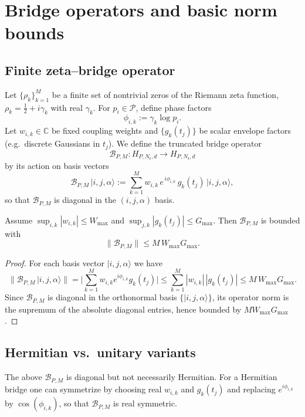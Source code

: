 \documentclass[11pt]{article}
\begin{document}
\section{Bridge operators and basic norm bounds}
\label{app:bridge}

\subsection{Finite zeta–bridge operator}

Let $\{\rho_k\}_{k=1}^M$ be a finite set of nontrivial zeros of the Riemann zeta function, $\rho_k = \tfrac12 + i\gamma_k$ with real $\gamma_k$.
For $p_i\in\mathcal{P}$, define phase factors
\[
\phi_{i,k} := \gamma_k \log p_i.
\]
Let $w_{i,k}\in\mathbb{C}$ be fixed coupling weights and $\{g_k(t_j)\}$ be scalar envelope factors (e.g.\ discrete Gaussians in $t_j$).
We define the truncated bridge operator
\[
\mathcal{B}_{P,M} : H_{P,N_t,d}\to H_{P,N_t,d}
\]
by its action on basis vectors
\[
\mathcal{B}_{P,M}\,\lvert i,j,\alpha\rangle
  := \sum_{k=1}^M w_{i,k}\, e^{\,i\phi_{i,k}}\,
     g_k(t_j) \,
     \lvert i,j,\alpha\rangle,
\]
so that $\mathcal{B}_{P,M}$ is diagonal in the $(i,j,\alpha)$ basis.

\begin{lemma}
Assume $\sup_{i,k} |w_{i,k}| \le W_{\max}$ and $\sup_{j,k} |g_k(t_j)| \le G_{\max}$.
Then $\mathcal{B}_{P,M}$ is bounded with
\[
\|\mathcal{B}_{P,M}\|
  \le M\, W_{\max} G_{\max}.
\]
\end{lemma}

\begin{proof}
For each basis vector $\lvert i,j,\alpha\rangle$ we have
\[
\bigl\|\mathcal{B}_{P,M}\,\lvert i,j,\alpha\rangle\bigr\|
  = \biggl|\sum_{k=1}^M w_{i,k} e^{i\phi_{i,k}} g_k(t_j)\biggr|
  \le \sum_{k=1}^M |w_{i,k}|\, |g_k(t_j)|
  \le M\,W_{\max} G_{\max}.
\]
Since $\mathcal{B}_{P,M}$ is diagonal in the orthonormal basis $\{\lvert i,j,\alpha\rangle\}$, its operator norm is the supremum of the absolute diagonal entries, hence bounded by $M W_{\max} G_{\max}$.
\end{proof}

\subsection{Hermitian vs.\ unitary variants}

The above $\mathcal{B}_{P,M}$ is diagonal but not necessarily Hermitian.
For a Hermitian bridge one can symmetrize by choosing real $w_{i,k}$ and $g_k(t_j)$ and replacing $e^{i\phi_{i,k}}$ by $\cos(\phi_{i,k})$, so that $\mathcal{B}_{P,M}$ is real symmetric.
\end{document}
